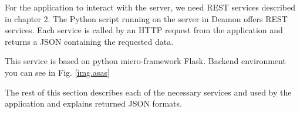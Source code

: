 
For the application to interact with the server, we need REST services described in chapter 2. The Python script running on the server in Deamon offers REST services. Each service is called by an HTTP request from the application and returns a JSON containing the requested data.

This service is based on python micro-framework Flask. Backend environment you can see in Fig. \ref{img.asas}


The rest of this section describes each of the necessary services and used by the application and explains returned JSON formats.

\newpage

